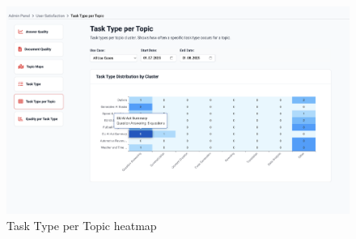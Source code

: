 \documentclass[
	english,
	ruledheaders=section,%
	class=report,%
	thesis={type=bachelor},%
	accentcolor=1b,%
	custommargins=true,%
	marginpar=false,%
	parskip=half-,%
	fontsize=11pt,%
	DIV=14,
]{tudapub}
\begin{document}
\begin{figure}[h!]
    \includegraphics[width=0.75\linewidth]{images/TaskTypePerTopic.png}
    \captionsetup{list=no}
    \caption{Task Type per Topic heatmap}
    \label{fig:task_type_per_topic}
\end{figure}
\clearpage
\end{document}
